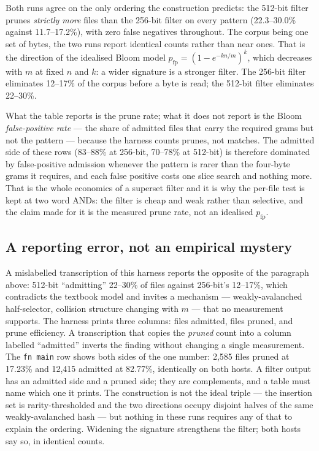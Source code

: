 \documentclass[11pt,letterpaper]{article}
\begin{document}
Both runs agree on the only ordering the construction predicts: the
512-bit filter prunes \emph{strictly more} files than the 256-bit filter
on every pattern (22.3--30.0\% against 11.7--17.2\%), with zero false
negatives throughout. The corpus being one set of bytes, the two runs
report identical counts rather than near ones. That
is the direction of the idealised Bloom model
$p_{\mathrm{fp}}=(1-e^{-kn/m})^{k}$, which decreases with $m$ at fixed $n$
and $k$: a wider signature is a stronger filter. The 256-bit filter
eliminates 12--17\% of the corpus before a byte is read; the 512-bit
filter eliminates 22--30\%.

What the table reports is the prune rate; what it does not report is the
Bloom \emph{false-positive rate} --- the share of admitted files that carry
the required grams but not the pattern --- because the harness counts
prunes, not matches. The admitted side of these rows (83--88\% at 256-bit,
70--78\% at 512-bit) is therefore dominated by false-positive admission
whenever the pattern is rarer than the four-byte grams it requires, and
each false positive costs one slice search and nothing more. That is the
whole economics of a superset filter and it is why the per-file test is
kept at two word ANDs: the filter is cheap and weak rather than selective,
and the claim made for it is the measured prune rate, not an idealised
$p_{\mathrm{fp}}$.

\subsection{A reporting error, not an empirical mystery}
\label{sec:ngram:inversion}
A mislabelled transcription of this harness reports the opposite of the
paragraph above: 512-bit ``admitting'' 22--30\% of files against
256-bit's 12--17\%, which contradicts the textbook model and invites a
mechanism --- weakly-avalanched half-selector, collision structure
changing with $m$ --- that no measurement supports. The harness prints
three columns: files admitted, files pruned, and prune efficiency. A
transcription that copies the \emph{pruned} count into a column labelled
``admitted'' inverts the finding without changing a single measurement.
The \texttt{fn main} row shows both sides of the one number: 2{,}585
files pruned at 17.23\% and 12{,}415 admitted at 82.77\%, identically on
both hosts. A filter output has an admitted side and a pruned side; they
are complements, and a table must name which one it prints. The
construction is not the ideal triple --- the insertion set is
rarity-thresholded and the two directions occupy disjoint halves of the
same weakly-avalanched hash --- but nothing in these runs requires any of
that to explain the ordering. Widening the signature strengthens the
filter; both hosts say so, in identical counts.
\end{document}

